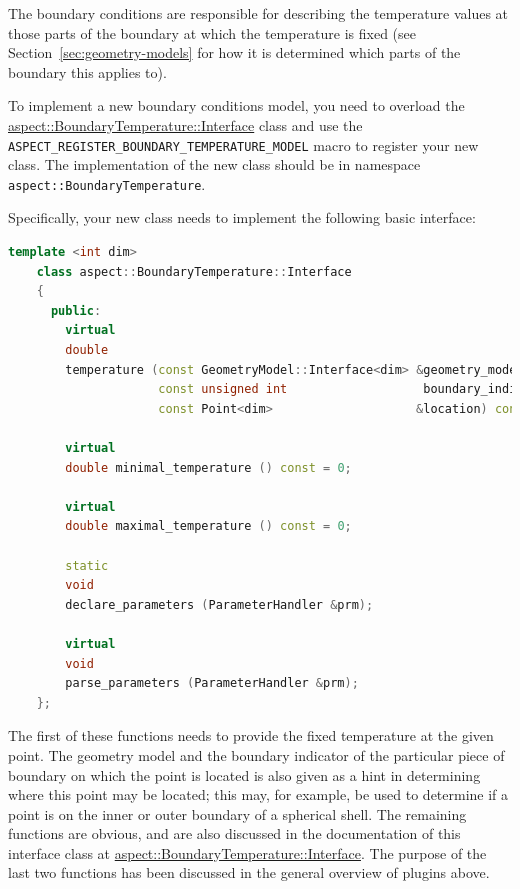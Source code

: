 \documentclass{article}
\begin{document}
The boundary conditions are responsible for describing the temperature values
at those parts of the boundary at which the temperature is fixed (see
Section~\ref{sec:geometry-models} for how it is determined which parts of the
boundary this applies to).

To implement a new boundary conditions model, you
need to overload the
\href{doc/doxygen/classaspect_1_1BoundaryTemperature_1_1Interface.html}{aspect::BoundaryTemperature::Interface}
class and use
the \texttt{ASPECT\_REGISTER\_BOUNDARY\_TEMPERATURE\_MODEL} macro to register your new
class. The implementation of the new class should be in namespace
\texttt{aspect::BoundaryTemperature}.

Specifically, your new class needs to implement the following basic interface:
\begin{lstlisting}[frame=single,language=C++]
    template <int dim>
    class aspect::BoundaryTemperature::Interface
    {
      public:
        virtual
        double
        temperature (const GeometryModel::Interface<dim> &geometry_model,
                     const unsigned int                   boundary_indicator,
                     const Point<dim>                    &location) const = 0;

        virtual
        double minimal_temperature () const = 0;

        virtual
        double maximal_temperature () const = 0;

        static
        void
        declare_parameters (ParameterHandler &prm);

        virtual
        void
        parse_parameters (ParameterHandler &prm);
    };
\end{lstlisting}
The first of these functions needs to provide the fixed temperature at the
given point. The geometry model and the boundary indicator of the particular
piece of boundary on which the point is located is also given as a hint in
determining where this point may be located; this may, for example, be used to
determine if a point is on the inner or outer boundary of a spherical
shell. The remaining functions are obvious, and are also
discussed in the documentation of this interface class at
\href{doc/doxygen/classaspect_1_1BoundaryTemperature_1_1Interface.html}{aspect::BoundaryTemperature::Interface}. The
purpose
of the last two functions has been discussed in the general overview of
plugins above.
\end{document}
